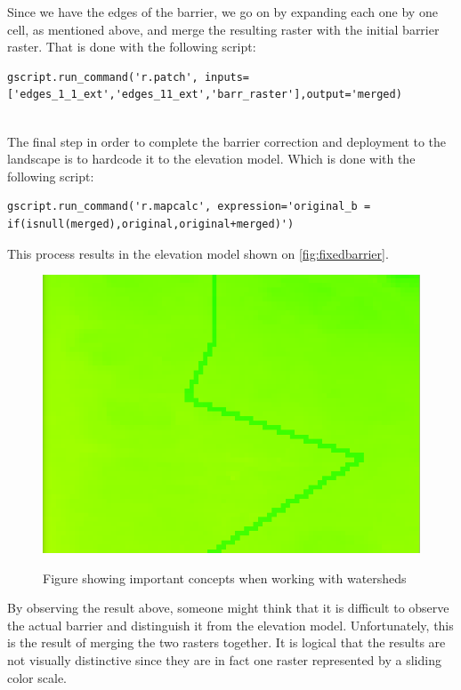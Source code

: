 Since we have the edges of the barrier, we go on by expanding each one by one cell, as mentioned above, and merge the resulting raster with the initial barrier raster. That is done with the following script:\\

\begin{lstlisting}
gscript.run_command('r.patch', inputs=['edges_1_1_ext','edges_11_ext','barr_raster'],output='merged)
\end{lstlisting}\\

The final step in order to complete the barrier correction and deployment to the landscape is to hardcode it to the elevation model. Which is done with the following script: \\

\begin{lstlisting}
gscript.run_command('r.mapcalc', expression='original_b = if(isnull(merged),original,original+merged)')
\end{lstlisting}

This process results in the elevation model shown on \autoref{fig:fixedbarrier}.

\begin{figure}[h!]
\centering
	{\includegraphics[width=0.75\linewidth]{gfx/Phase_4/Barrier5.png}}
\caption{Figure showing important concepts when working with watersheds}
\label{fig:fixedbarrier}
\end{figure}

By observing the result above, someone might think that it is difficult to observe the actual barrier and distinguish it from the elevation model. Unfortunately, this is the result of merging the two rasters together. It is logical that the results are not visually distinctive since they are in fact one raster represented by a sliding color scale.

